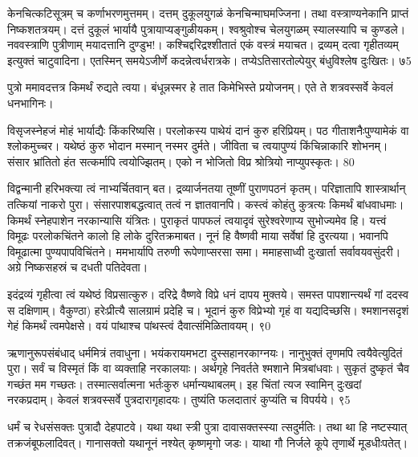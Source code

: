 केनचित्कटिसूत्रम् च कर्णाभरणमुत्तमम्।
दत्तम् दुकूलयुगळं केनचिन्माघमज्जिना।
तथा वस्त्राण्यनेकानि प्राप्तं निष्कशतत्रयम्।
दत्तं दुकूलं भार्यायै पुत्रायाप्यङ्गुळीयकम्।
श्वश्रुवोश्च चेलयुगळम् स्यालस्यापि च कुण्डले।
नववस्त्राणि पुत्रीणाम् मयादत्तानि दुण्डुभ!।
कश्चिद्दरिद्रश्शीतातं एकं वस्त्रं मयाचत।
द्रव्यम् दत्वा गृहीतव्यम् इत्युक्तं चाटुवादिना।
एतस्मिन् समयेऽजीर्णे कदन्नेत्वर्धरात्रके।
तप्येऽतिसारतोल्पेयुर् बंधुविश्लेष दुःखितः।
७5

पुत्रो ममावदत्तत्र किमर्थं रुद्यते त्वया।
बंधून्नस्मर हे तात किमेभिस्ते प्रयोजनम्।
एते ते शत्रवस्सर्वे केवलं धनभागिनः।

विसृजस्नेहजं मोहं भार्याद्यैः किंकरिष्यसि।
परलोकस्य पाथेयं दानं कुरु हरिप्रियम्।
पठ गीताशनैःपुण्यामेकं वा श्लोकमुच्चर।
यथेष्ठं कुरु भोदान मस्मान् नस्मर दुर्मते।
जीविता च त्वयापुण्यं किंचिन्नाकारि शोभनम्।
संसार भ्रांतितो हंत सत्कर्मापि त्वयोज्झितम्।
एको न भोजितो विप्र श्रोत्रियो नाप्युपस्कृतः।
80

विद्वन्मानी हरिभक्त्या त्वं नाभ्यर्चितवान् बत।
द्रव्यार्जनतया तूष्णीं पुराणपठनं कृतम्।
परिज्ञातापि शास्त्रार्थान् तत्कियां नाकरो पुरा।
संसारपाशबद्धत्वात् तत्वं न ज्ञातवानपि।
कस्त्वं कोहंतु कुत्रत्यः किमर्थं बांधवाधमाः।
किमर्थं स्नेहपाशेन नरकान्यासि यंत्रितः।
पुराकृतं पापफलं त्वयादृवं सुरेश्वरेणाप्य
सुभोज्यमेव हि।
यत्त्वं विमूढः परलोकचिंतने कालो
हि लोके दुरितक्रमाबत।
नूनं हि वैष्णवी माया सर्वेषां हि दुरत्यया।
भवानपि विमूढात्मा पुण्यपापविचिंतने।
ममभार्यापि तरुणी रूपेणाप्सरसा समा।
ममाहसाध्वी दुःखार्ता सर्वावयवसुंदरी।
अग्रे निष्कसहस्रं च दधती पतिदेवता।

इदंद्रव्यं गृहीत्वा त्वं यथेष्ठं विप्रसात्कुरु।
दरिद्रे वैष्णवे विप्रे धनं दापय मुक्तये।
समस्त पापशान्त्यर्थं गां ददस्व स दक्षिणाम्।
वैकुण्ठा) हरेःप्रीत्यै सालग्रामं प्रदेहि च।
भूदानं कुरु विप्रेभ्यो गृहं वा यद्यदिच्छसि।
श्मशानसदृशं गेहं किमर्थं त्वमपेक्षसे।
वयं पांथाश्च पांथस्त्वं दैवात्संमिळितावयम्।
९0

ऋणानुरूपसंबंधाद् धर्ममित्रं तवाधुना।
भयंकरायमभटा दुस्सहानरकाग्नयः।
नानुभुक्तं तृणमपि त्वयैवेत्युदितं पुरा।
सर्वं च विस्मृतं किं वा व्यक्ताहि नरकालयाः।
अर्थगृहे निवर्तते श्मशाने मित्रबांधवाः।
सुकृतं दुष्कृतं चैव गच्छंत मम गच्छतः।
तस्मात्सर्वात्मना भर्तःकुरु धर्मान्यथाबलम्।
इह चिंतां त्यज स्वामिन् दुःखदां नरकप्रदाम्।
केवलं शत्रवस्सर्वे पुत्रदारागृहादयः।
तुष्यंति फलदातारं कुप्यंति च विपर्यये।
९5

धर्मं च रेधसंसक्तः पुत्रादौ देहपाटवे।
यथा यथा स्त्री पुत्रा दावासक्तस्स्या त्सदुर्मतिः।
तथा था हि नष्टस्यात् तक्रजंबूफलादिवत्।
गानासक्तो यथानूनं नश्येत् कृष्णमृगो जडः।
याथा गौ निर्जले कूपे तृणार्थे मूडधीःपतेत्।

